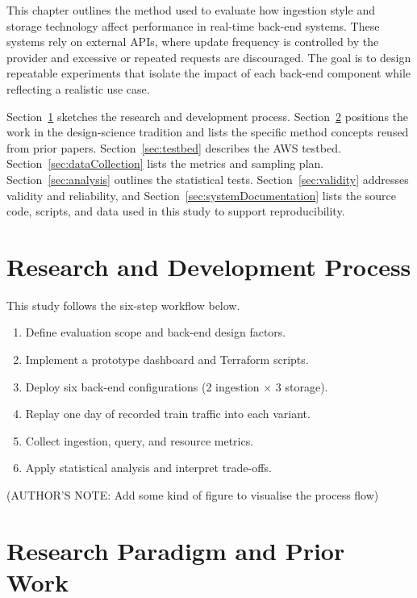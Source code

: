 \documentclass[nomenclature, english, biblatex]{kththesis}
\numberwithin{listing}{chapter}
\begin{document}
This chapter outlines the method used to evaluate how ingestion style and storage technology affect performance in real-time back-end systems. These systems rely on external \glspl{API}, where update frequency is controlled by the provider and excessive or repeated requests are discouraged. The goal is to design repeatable experiments that isolate the impact of each back-end component while reflecting a realistic use case.

Section~\ref{sec:researchProcess} sketches the research and development process.  
Section~\ref{sec:researchParadigm} positions the work in the design-science tradition and lists the specific method concepts reused from prior papers.  
Section~\ref{sec:testbed} describes the \gls{AWS} testbed.  
Section~\ref{sec:dataCollection} lists the metrics and sampling plan.  
Section~\ref{sec:analysis} outlines the statistical tests.  
Section~\ref{sec:validity} addresses validity and reliability, and Section~\ref{sec:systemDocumentation} lists the source code, scripts, and data used in this study to support reproducibility.



\section{Research and Development Process}
\label{sec:researchProcess}

This study follows the six-step workflow below.

\begin{enumerate}[label=\textbf{Step \arabic*}, leftmargin=*]
  \item Define evaluation scope and back-end design factors.
  \item Implement a prototype dashboard and Terraform scripts.
  \item Deploy six back-end configurations (2 ingestion $\times$ 3 storage).
  \item Replay one day of recorded train traffic into each variant.
  \item Collect ingestion, query, and resource metrics.
  \item Apply statistical analysis and interpret trade-offs.
\end{enumerate}

(AUTHOR'S NOTE: Add some kind of figure to visualise the process flow)


\section{Research Paradigm and Prior Work}
\label{sec:researchParadigm}
\end{document}
